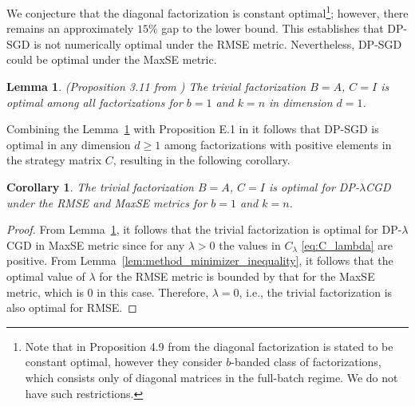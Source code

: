 \documentclass{article}
\theoremstyle{plain}
\newtheorem{lemma}[theorem]{Lemma}
\newtheorem{corollary}[theorem]{Corollary}
\theoremstyle{definition}
\theoremstyle{remark}
\newcommand{\method}{DP-$\lambda$CGD\xspace}
\begin{document}
We conjecture that the diagonal factorization is constant optimal\footnote{Note that in Proposition 4.9 from \citet{pillutla2025correlated} the diagonal factorization is stated to be constant optimal, however they consider $b$-banded class of factorizations, which consists only of diagonal matrices in the full-batch regime. We do not have such restrictions.}; however, there
remains an approximately $15\%$ gap to the lower bound. This establishes that DP-SGD is not
numerically optimal under the RMSE metric. Nevertheless, DP-SGD could be optimal under the
MaxSE metric. 

\begin{lemma}(Proposition 3.11 from \citet{pillutla2025correlated})
\label{lem:dp_sgd_maxse_optimality}
The trivial factorization $B = A$, $C = I$ is optimal among all
factorizations for $b = 1$ and $k = n$ in dimension $d = 1$.
\end{lemma}

Combining the Lemma~\ref{lem:dp_sgd_maxse_optimality} with  Proposition E.1 in \citet{choquette2023amplified} it follows that DP-SGD is optimal in any dimension $d\ge 1$ among factorizations with positive elements in the strategy matrix $C$, resulting in the following corollary.

\begin{corollary}
The trivial factorization $B = A$, $C = I$ is optimal for \method under the RMSE
and MaxSE metrics for $b = 1$ and $k = n$.
\end{corollary}
\begin{proof}
From Lemma~\ref{lem:dp_sgd_maxse_optimality}, it follows that the trivial
factorization is optimal for \method in MaxSE metric since for any $\lambda > 0$ the values in $C_{\lambda}$ \eqref{eq:C_lambda} are positive.
From Lemma~\ref{lem:method_minimizer_inequality}, it follows that the optimal value of
$\lambda$ for the RMSE metric is bounded by that for the MaxSE metric, which is
$0$ in this case. Therefore, $\lambda = 0$, i.e., the trivial factorization is
also optimal for RMSE.
\end{proof}
\end{document}
